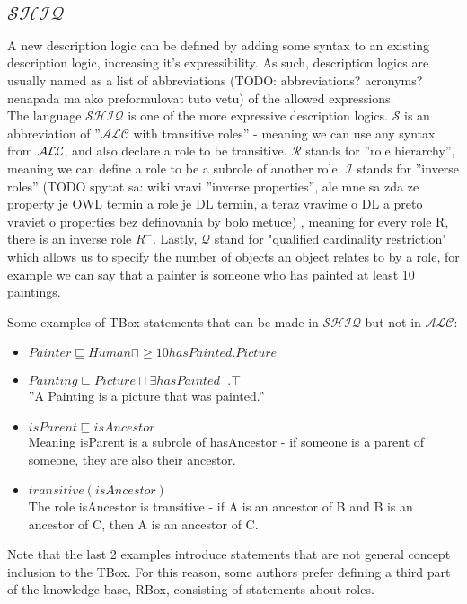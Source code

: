 \subsection{$\mathcal{SHIQ}$} 
\label{SHIQ}
A new description logic can be defined by adding some syntax to an existing description logic, increasing it's expressibility. As such, description logics are usually named as a list of abbreviations (TODO: abbreviations? acronyms? nenapada ma ako preformulovat tuto vetu) of the allowed expressions.\\  
The language $\mathcal{SHIQ}$ is one of the more expressive description logics. $\mathcal{S}$ is an abbreviation of ''$\mathcal{ALC}$ with transitive roles'' - meaning we can use any syntax from $\mathcal{ALC}$, and also declare a role to be transitive.
$\mathcal{R}$ stands for ''role hierarchy'', meaning we can define a role to be a subrole of another role. $\mathcal{I}$ stands for ''inverse roles'' (TODO spytat sa: wiki vravi ''inverse properties'', ale mne sa zda ze property je OWL termin a role je DL termin, a teraz vravime o DL a preto vraviet o properties bez definovania by bolo metuce) , meaning for every role R, there is an inverse role $R^-$. Lastly, $\mathcal{Q}$ stand for "qualified cardinality restriction" which allows us to specify the number of objects an object relates to by a role, for example we can say that a painter is someone who has painted at least 10 paintings.


\begin{myex} 
Some examples of TBox statements that can be made in $\mathcal{SHIQ}$ but not in $\mathcal{ALC}$:
\begin{itemize}
\item  $ Painter \sqsubseteq Human \sqcap \geq 10 hasPainted.Picture $
\item  $ Painting \sqsubseteq Picture \sqcap \exists hasPainted^-.\top$ \\ 
''A Painting is a picture that was painted.''
\item $isParent \sqsubseteq isAncestor$ \\
Meaning isParent is a subrole of hasAncestor - if someone is a parent of someone, they are also their ancestor.
\item $ transitive(isAncestor)$ \\
 The role isAncestor is transitive - if A is an ancestor of B and B is an ancestor of C, then A is an ancestor of C.
\end{itemize}
Note that the last 2 examples introduce  statements that are not general concept inclusion to the TBox. For this reason, some authors prefer defining a third part of the knowledge base, RBox, consisting of statements about roles.\\
\end{myex}


